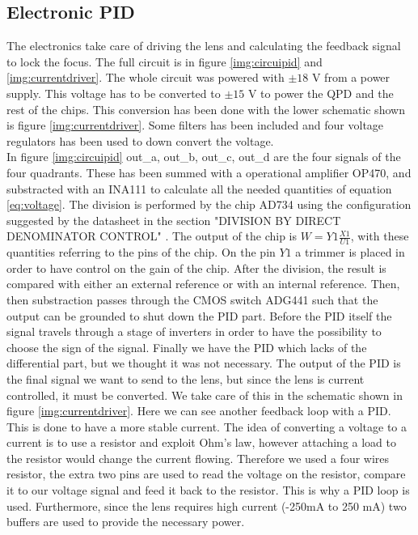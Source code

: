 \documentclass[a4paper,10pt]{article}
\begin{document}
\subsection{Electronic PID}
The electronics take care of driving the lens and calculating the feedback signal to lock the focus. The full circuit is in figure \ref{img:circuipid} and \ref{img:currentdriver}. The whole circuit was powered with $\pm18$ V from a power supply. This voltage has to be converted to $\pm 15$ V to power the QPD and the rest of the chips. This conversion has been done with the lower schematic shown is figure \ref{img:currentdriver}. Some filters has been included and four voltage regulators has been used to down convert the voltage.\\
In figure \ref{img:circuipid} out\_a,  out\_b, out\_c, out\_d are the four signals of the four quadrants. These has been summed with a operational amplifier OP470, and substracted with an INA111 to calculate all the needed quantities of equation \eqref{eq:voltage}. The division is performed by the chip AD734 using the configuration suggested by the datasheet in the section "DIVISION BY DIRECT DENOMINATOR CONTROL" \cite{ad734}. The output of the chip is $W = Y1\frac{X1}{U1}$, with these quantities referring to the pins of the chip. On the pin $Y1$ a trimmer is placed in order to have control on the gain of the chip. After the division, the result is compared with either an external reference or with an internal reference. Then, then substraction passes through the CMOS switch ADG441 such that the output can be grounded to shut down the PID part. Before the PID itself the signal travels through a stage of inverters in order to have the possibility to choose the sign of the signal. Finally we have the PID which lacks of the differential part, but we thought it was not necessary. The output of the PID is the final signal we want to send to the lens, but since the lens is current controlled, it must be converted. We take care of this in the schematic shown in figure \ref{img:currentdriver}. Here we can see another feedback loop with a PID. This is done to have a more stable current. The idea of converting a voltage to a current is to use a resistor and exploit Ohm's law, however attaching a load to the resistor would change the current flowing. Therefore we used a four wires resistor, the extra two pins are used to read the voltage on the resistor, compare it to our voltage signal and feed it back to the resistor. This is why a PID loop is used. Furthermore, since the lens requires high current (-250mA to 250 mA) two buffers are used to provide the necessary power.\\
\end{document}
